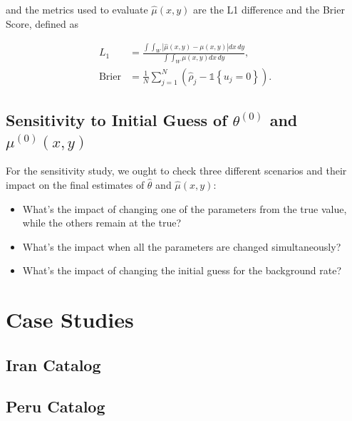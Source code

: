 \noindent and the metrics used to evaluate $\hat{\mu}(x,y)$ are the L1 difference and the Brier Score, defined as

\begin{equation}
  \label{eq-metrics-mu}
  \begin{split}
    L_{1} &= \frac{\int\int_{W}|\hat{\mu}(x,y) - \mu(x,y)|dx\, dy}{\int\int_{W}\mu(x,y)dx\, dy}, \\
    \mathrm{Brier} &= \frac{1}{N}\sum_{j = 1}^{N}\left(\hat{\rho}_{j} - \mathds{1}\left\{u_{j} = 0\right\}\right).
  \end{split}
\end{equation}

\section{Sensitivity to Initial Guess of $\theta^{(0)}$ and $\mu^{(0)}(x,y)$}
\label{sec-sensiv-theta-0}

For the sensitivity study, we ought to check three different scenarios and their impact on the final estimates of $\hat{\theta}$ and $\hat{\mu}(x,y)$:
\begin{itemize}
\item What's the impact of changing one of the parameters from the true value, while the others remain at the true?
\item What's the impact when all the parameters are changed simultaneously?
\item What's the impact of changing the initial guess for the background rate?
\end{itemize}

\chapter{Case Studies}
\label{chap-case-studies}

\section{Iran Catalog}
\label{sec-iran-cat}

\section{Peru Catalog}
\label{sec-peru-cat}
